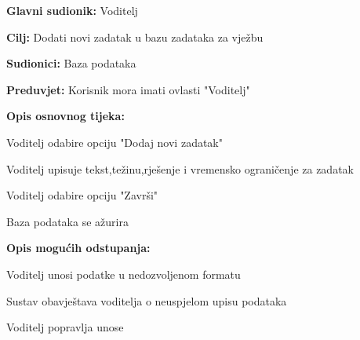 					\noindent {}
					\begin{packed_item}
	
						\item \textbf{Glavni sudionik: } Voditelj
						\item  \textbf{Cilj:} Dodati novi zadatak u bazu zadataka za vježbu
						\item  \textbf{Sudionici:} Baza podataka
						\item  \textbf{Preduvjet:} Korisnik mora imati ovlasti "Voditelj"
						\item  \textbf{Opis osnovnog tijeka:}
						
						\item[] \begin{packed_enum}
	
							\item Voditelj odabire opciju "Dodaj novi zadatak"
							\item Voditelj upisuje tekst,težinu,rješenje i vremensko ograničenje za zadatak
							\item Voditelj odabire opciju "Završi"
							\item Baza podataka se ažurira
						\end{packed_enum}

						\item  \textbf{Opis mogućih odstupanja:}
						
						\item[] \begin{packed_item}
	
							\item[2.a] Voditelj unosi podatke u nedozvoljenom formatu
							\item[] \begin{packed_enum}
								
								\item Sustav obavještava voditelja o neuspjelom upisu podataka
								\item Voditelj popravlja unose
								
							\end{packed_enum}
						\end{packed_item}
						
						
					\end{packed_item}

